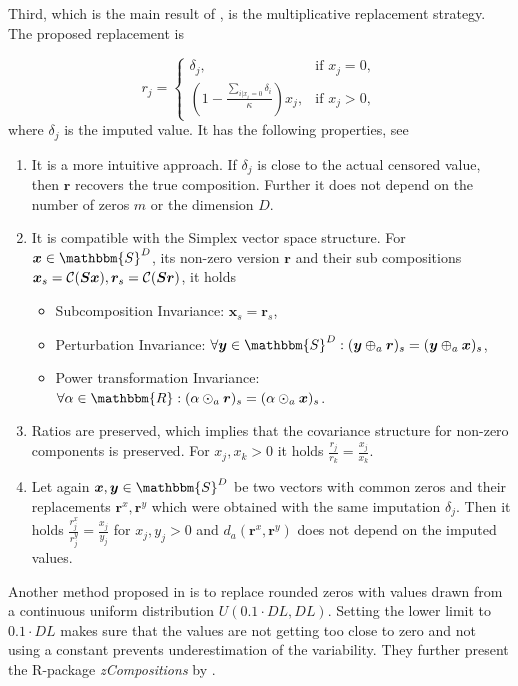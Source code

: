 Third, which is the main result of \textcite{Josep:2003}, is the multiplicative replacement strategy. The proposed replacement is 

\begin{equation}
r_j = 
\begin{cases}
\delta_j, & \text{if } x_j=0, \\
\left( 1- \frac{\sum_{i | x_i=0}\delta_i}{\kappa} \right)x_j, & \text{if } x_j>0, 
\end{cases}
\label{eq:multiplicative replacement strategy}
\end{equation}
%
where $\delta_j$ is the imputed value. It has the following properties, see \textcite{Josep:2003} 

\begin{enumerate}
	\item It is a more intuitive approach. If $\delta_j$ is close to the actual censored value, then $\bm{r}$ recovers the true composition. Further it does not depend on the number of zeros $m$ or the dimension $D$. 
	\item It is compatible with the Simplex vector space structure. For $\bm{x} \in \mathbbm{S}^D$, its non-zero version $\bm{r}$ and their sub compositions $\bm{x}_s = \mathcal{C}(\bm{Sx}),\bm{r}_s = \mathcal{C}(\bm{Sr})$, it holds 
	\begin{itemize}
		\item Subcomposition Invariance: $\bm{x}_s = \bm{r}_s$,
		\item Perturbation Invariance: $\forall \bm{y} \in \mathbbm{S}^D: (\bm{y} \oplus_a \bm{r})_s = (\bm{y} \oplus_a \bm{x})_s$,
		\item Power transformation Invariance: $\forall \alpha \in \mathbbm{R}: (\alpha \odot_a \bm{r})_s = (\alpha \odot_a \bm{x})_s$. 
	\end{itemize}
	\item Ratios are preserved, which implies that the covariance structure for non-zero components is preserved. For  $x_j,x_k >0$ it holds $\frac{r_j}{r_k} = \frac{x_j}{x_k}$. 
	\item Let again $\bm{x},\bm{y} \in \mathbbm{S}^D$ be two vectors with common zeros and their replacements $\bm{r}^x,\bm{r}^y$ which were obtained with the same imputation $\delta_j$. Then it holds $\frac{r^x_j}{r^y_j}=\frac{x_j}{y_j}$ for $x_j,y_j>0$ and $d_a(\bm{r}^x,\bm{r}^y)$ does not depend on the imputed values.
\end{enumerate}

Another method proposed in \textcite{Lubbe:2021} is to replace rounded zeros with values drawn from a continuous uniform distribution $U(0.1\cdot DL,DL)$. Setting the lower limit to $0.1\cdot DL$ makes sure that the values are not getting too close to zero and not using a constant prevents underestimation of the variability. They further present the R-package \textit{zCompositions} by \textcite{Palarea-Albaladejo:2015}. 

